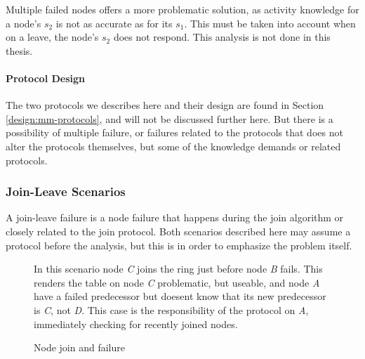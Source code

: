 Multiple failed nodes offers a more problematic solution, as activity knowledge for a node's
 $s_2$ is not as accurate as for its $s_1$. This must be taken into account when on a leave,
 the node's $s_2$ does not respond. This analysis is not done in this thesis.

\paragraph{Protocol Design}
The two protocols we describes here and their design are found
 in Section \ref{design:mm-protocols}, and will not be discussed further here.
 But there is a possibility of multiple failure, or failures related to the
 protocols that does not alter the protocols themselves, but some of the
 knowledge demands or related protocols.

\subsubsection{Join-Leave Scenarios}
\label{analysis:JoinFailure}

A join-leave failure is a node failure that happens during the join algorithm or closely related to
 the join protocol. Both scenarios described here may assume a  protocol
 before the analysis, but this is in order to emphasize the problem itself.

\begin{figure}[htp]
\centering
{}
\parbox{.9\linewidth}{ \small
  In this scenario node \emph{C} joins the ring just before node \emph{B} fails. This
   renders the table on node \emph{C} problematic, but useable, and node \emph{A} have
   a failed predecessor but doesent know that its new predecessor is \emph{C}, not
   \emph{D}. This case is the responsibility of the  protocol on \emph{A},
   immediately checking for recently joined nodes.
}

\caption{Node join and failure}\label{fig:JoinNDie}

\end{figure}

